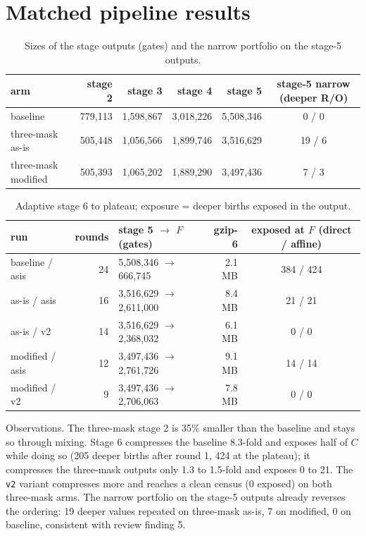 \documentclass[11pt,a4paper]{article}
\newcommand{\code}[1]{\texttt{#1}}
\begin{document}
\section{Matched pipeline results}
\begin{table}[H]\centering\small
\begin{tabular}{lrrrrc}
\toprule
arm & stage 2 & stage 3 & stage 4 & stage 5 & stage-5 narrow (deeper R/O) \\
\midrule
baseline & 779,113 & 1,598,867 & 3,018,226 & 5,508,346 & 0 / 0 \\
three-mask as-is & 505,448 & 1,056,566 & 1,899,746 & 3,516,629 & 19 / 6 \\
three-mask modified & 505,393 & 1,065,202 & 1,889,290 & 3,497,436 & 7 / 3 \\
\bottomrule
\end{tabular}
\caption{Sizes of the stage outputs (gates) and the narrow portfolio on the stage-5 outputs.}
\end{table}
\begin{table}[H]\centering\small
\begin{tabular}{lrlrc}
\toprule
run & rounds & stage 5 $\to$ $F$ (gates) & gzip-6 & exposed at $F$ (direct / affine) \\
\midrule
baseline / asis & 24 & 5,508,346 $\to$ 666,745 & 2.1 MB & 384 / 424 \\
as-is / asis & 16 & 3,516,629 $\to$ 2,611,000 & 8.4 MB & 21 / 21 \\
as-is / v2 & 14 & 3,516,629 $\to$ 2,368,032 & 6.1 MB & 0 / 0 \\
modified / asis & 12 & 3,497,436 $\to$ 2,761,726 & 9.1 MB & 14 / 14 \\
modified / v2 & 9 & 3,497,436 $\to$ 2,706,063 & 7.8 MB & 0 / 0 \\
\bottomrule
\end{tabular}
\caption{Adaptive stage 6 to plateau; exposure = deeper births exposed in the output.}
\end{table}
Observations. The three-mask stage 2 is 35\% smaller than the baseline and stays so through mixing. Stage 6 compresses the baseline 8.3-fold and exposes half of $C$ while doing so (205 deeper births after round 1, 424 at the plateau); it compresses the three-mask outputs only 1.3 to 1.5-fold and exposes 0 to 21. The \code{v2} variant compresses more and reaches a clean census (0 exposed) on both three-mask arms. The narrow portfolio on the stage-5 outputs already reverses the ordering: 19 deeper values repeated on three-mask as-is, 7 on modified, 0 on baseline, consistent with review finding 5.
\end{document}
